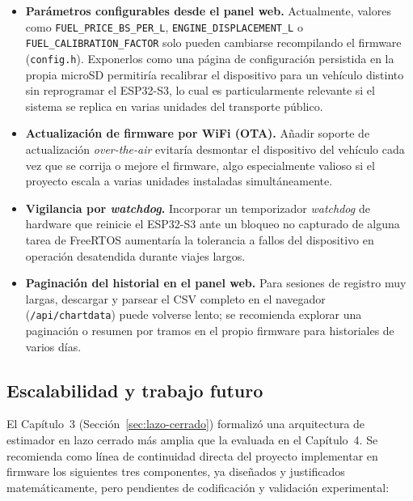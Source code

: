 \begin{itemize}
	\item \textbf{Parámetros configurables desde el panel web.} Actualmente, valores como \texttt{FUEL\_PRICE\_BS\_PER\_L}, \texttt{ENGINE\_DISPLACEMENT\_L} o \texttt{FUEL\_CALIBRATION\_FACTOR} solo pueden cambiarse recompilando el firmware (\texttt{config.h}). Exponerlos como una página de configuración persistida en la propia microSD permitiría recalibrar el dispositivo para un vehículo distinto sin reprogramar el ESP32-S3, lo cual es particularmente relevante si el sistema se replica en varias unidades del transporte público.
	\item \textbf{Actualización de firmware por WiFi (OTA).} Añadir soporte de actualización \textit{over-the-air} evitaría desmontar el dispositivo del vehículo cada vez que se corrija o mejore el firmware, algo especialmente valioso si el proyecto escala a varias unidades instaladas simultáneamente.
	\item \textbf{Vigilancia por \textit{watchdog}.} Incorporar un temporizador \textit{watchdog} de hardware que reinicie el ESP32-S3 ante un bloqueo no capturado de alguna tarea de FreeRTOS aumentaría la tolerancia a fallos del dispositivo en operación desatendida durante viajes largos.
	\item \textbf{Paginación del historial en el panel web.} Para sesiones de registro muy largas, descargar y parsear el CSV completo en el navegador (\texttt{/api/chartdata}) puede volverse lento; se recomienda explorar una paginación o resumen por tramos en el propio firmware para historiales de varios días.
\end{itemize}

\subsection{Escalabilidad y trabajo futuro}
\label{sec:escalabilidad}

El Capítulo~3 (Sección~\ref{sec:lazo-cerrado}) formalizó una arquitectura de
estimador en lazo cerrado más amplia que la evaluada en el Capítulo~4. Se
recomienda como línea de continuidad directa del proyecto implementar en
firmware los siguientes tres componentes, ya diseñados y justificados
matemáticamente, pero pendientes de codificación y validación experimental:

